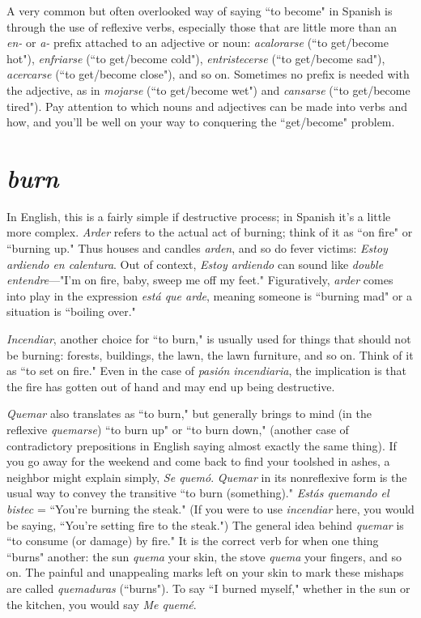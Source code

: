 A very common but often overlooked way of saying ``to become" in Spanish is through the use of reflexive verbs, especially those
that are little more than an \emph{en-} or \emph{a-} prefix attached to an adjective or
noun: \emph{acalorarse} (``to get/become hot"), \emph{enfriarse} (``to get/become
cold"), \emph{entristecerse} (``to get/become sad"), \emph{acercarse} (``to get/become
close"), and so on. Sometimes no prefix is needed with the adjective,
as in \emph{mojarse} (``to get/become wet") and \emph{cansarse} (``to get/become
tired"). Pay attention to which nouns and adjectives can be made into
verbs and how, and you'll be well on your way to conquering the ``get/become" problem.

\section{\emph{burn}}

In English, this is a fairly simple if destructive process; in
Spanish it's a little more complex. \emph{Arder} refers to the actual act of
burning; think of it as ``on fire" or ``burning up." Thus houses and
candles \emph{arden}, and so do fever victims: \emph{Estoy ardiendo en calentura}.
Out of context, \emph{Estoy ardiendo} can sound like \emph{double entendre}---"I'm
on fire, baby, sweep me off my feet." Figuratively, \emph{arder} comes into
play in the expression \emph{está que arde}, meaning someone is ``burning
mad" or a situation is ``boiling over."

\emph{Incendiar}, another choice for ``to burn," is usually used for
things that should not be burning: forests, buildings, the lawn, the
lawn furniture, and so on. Think of it as ``to set on fire." Even in the
case of \emph{pasión incendiaria}, the implication is that the fire has gotten
out of hand and may end up being destructive.

\emph{Quemar} also translates as ``to burn," but generally brings to
mind (in the reflexive \emph{quemarse}) ``to burn up" or ``to burn down," (another case of contradictory prepositions in English saying almost exactly the same thing). If you go away for the weekend and come back
to find your toolshed in ashes, a neighbor might explain simply, \emph{Se
quemó}. \emph{Quemar} in its nonreflexive form is the usual way to convey the
transitive ``to burn (something)." \emph{Estás quemando el bistec} = ``You're
burning the steak." (If you were to use \emph{incendiar} here, you would be
saying, ``You're setting fire to the steak.") The general idea behind \emph{quemar} is ``to consume (or damage) by fire." It is the correct verb for when
one thing ``burns" another: the sun \emph{quema} your skin, the stove \emph{quema}
your fingers, and so on. The painful and unappealing marks left on
your skin to mark these mishaps are called \emph{quemaduras} (``burns"). To
say ``I burned myself," whether in the sun or the kitchen, you would
say \emph{Me quemé}.

